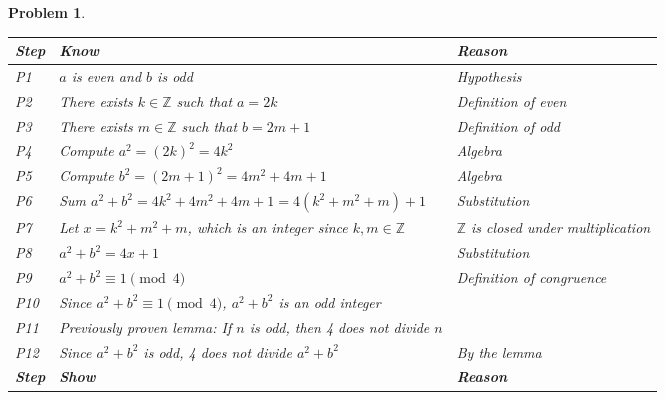 \documentclass[12pt]{article}
\newtheorem{problem}{Problem} %
\theoremstyle{definition}
\begin{document}
\begin{problem}
\begin{enumerate}[label=(\alph*)]
    \begin{center}
        \begin{tabular}{|p{}|p{}|p{}|}
        \hline
        \textbf{Step} & \textbf{Know} & \textbf{Reason} \\
        \hline
            P1 & \( a \) is even and \( b \) is odd & Hypothesis \\
        \hline
            P2 & There exists \( k \in \mathbb{Z} \) such that \( a = 2k \) & Definition of even \\
        \hline
            P3 & There exists \( m \in \mathbb{Z} \) such that \( b = 2m + 1 \) & Definition of odd \\
        \hline
            P4 & Compute \( a^2 = (2k)^2 = 4k^2 \) & Algebra \\
        \hline
            P5 & Compute \( b^2 = (2m+1)^2 = 4m^2 + 4m + 1 \) & Algebra \\
        \hline
            P6 & Sum \( a^2 + b^2 = 4k^2 + 4m^2 + 4m + 1 = 4(k^2 + m^2 + m) + 1 \) & Substitution \\
        \hline
            P7 & Let \( x = k^2 + m^2 + m \), which is an integer since \( k, m \in \mathbb{Z} \) & \( \mathbb{Z} \) is closed under multiplication \\
        \hline
            P8 & \( a^2 + b^2 = 4x + 1 \) & Substitution \\
        \hline
            P9 & \( a^2 + b^2 \equiv 1 \pmod{4} \) & Definition of congruence \\
        \hline
            P10 & Since \( a^2 + b^2 \equiv 1 \pmod{4} \), \( a^2 + b^2 \) is an odd integer & \\
        \hline
            P11 & Previously proven lemma: If \( n \) is odd, then 4 does not divide \( n \) &  \\
        \hline
            P12 & Since \( a^2 + b^2 \) is odd, 4 does not divide \( a^2 + b^2 \) & By the lemma \\
        \hline
        \textbf{Step} & \textbf{Show} & \textbf{Reason} \\
        \hline
\end{tabular}

    \end{center}
    
\end{enumerate}
\end{problem}

\bigskip
\end{document}

